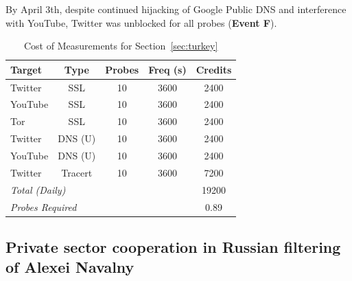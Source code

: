 By April 3th, despite continued hijacking of Google Public DNS and interference with YouTube, Twitter was unblocked for all probes
(\textbf{Event F}).

\begin{table}
    \begin{tabular}{l | c | c | c | c}
        \textbf{Target} & \textbf{Type}  & \textbf{Probes}  & \textbf{Freq (s)}  & \textbf{Credits}\\
        \hline
		 Twitter & SSL & 10 & 3600 & 2400 \\
		 YouTube & SSL & 10 & 3600 & 2400 \\
		 Tor & SSL & 10 & 3600 & 2400 \\
		 Twitter & DNS (U) & 10 & 3600 & 2400 \\
		 YouTube & DNS (U) & 10 & 3600 & 2400 \\
		 Twitter & Tracert & 10 & 3600 & 7200 \\
        \hline
        \multicolumn{4}{l}{\textit{Total (Daily)}}  & 19200\\
        \multicolumn{4}{l}{\textit{Probes Required}} & 0.89\\
        \hline        
    \end{tabular}
    \caption{Cost of Measurements for Section~\ref{sec:turkey}}
    \label{table:tr-costs}
\end{table}

\subsection{Private sector cooperation in Russian filtering of Alexei Navalny}
\label{sec:russia}


